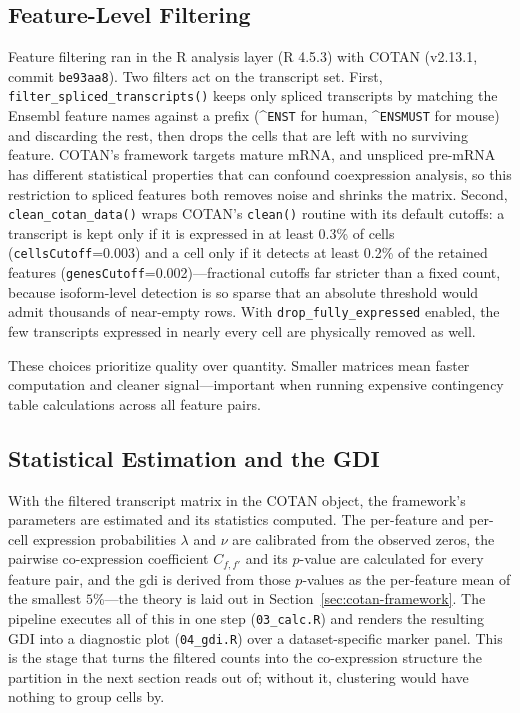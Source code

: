 \subsection*{Feature-Level Filtering}

Feature filtering ran in the R analysis layer (R 4.5.3) with COTAN (v2.13.1, commit \texttt{be93aa8}). Two filters act on the transcript set. First, \texttt{filter\_spliced\_transcripts()} keeps only spliced transcripts by matching the Ensembl feature names against a prefix (\textasciicircum\texttt{ENST} for human, \textasciicircum\texttt{ENSMUST} for mouse) and discarding the rest, then drops the cells that are left with no surviving feature. COTAN's framework\cite{galfre2021cotan} targets mature mRNA, and unspliced pre-mRNA has different statistical properties that can confound \gls{coexpression} analysis, so this restriction to spliced features both removes noise and shrinks the matrix. Second, \texttt{clean\_cotan\_data()} wraps COTAN's \texttt{clean()} routine with its default cutoffs: a transcript is kept only if it is expressed in at least 0.3\% of cells (\texttt{cellsCutoff}=0.003) and a cell only if it detects at least 0.2\% of the retained features (\texttt{genesCutoff}=0.002)---fractional cutoffs far stricter than a fixed count, because isoform-level detection is so sparse that an absolute threshold would admit thousands of near-empty rows. With \texttt{drop\_fully\_expressed} enabled, the few transcripts expressed in nearly every cell are physically removed as well.

These choices prioritize quality over quantity. Smaller matrices mean faster computation and cleaner signal---important when running expensive contingency table calculations across all feature pairs.

\subsection*{Statistical Estimation and the GDI}

With the filtered transcript matrix in the COTAN object, the framework's parameters are estimated and its statistics computed. The per-feature and per-cell expression probabilities $\lambda$ and $\nu$ are calibrated from the observed zeros, the pairwise co-expression coefficient $C_{f,f'}$ and its $p$-value are calculated for every feature pair, and the \gls{gdi} is derived from those $p$-values as the per-feature mean of the smallest $5\%$---the theory is laid out in Section~\ref{sec:cotan-framework}. The pipeline executes all of this in one step (\texttt{03\_calc.R}) and renders the resulting GDI into a diagnostic plot (\texttt{04\_gdi.R}) over a dataset-specific marker panel. This is the stage that turns the filtered counts into the co-expression structure the partition in the next section reads out of; without it, clustering would have nothing to group cells by.

